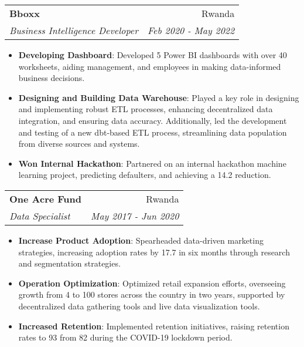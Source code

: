 \documentclass[letterpaper,11pt]{article}
\makeatletter
\newcommand{\resumeItem}[2]{
  \item\small{
    \textbf{#1}{: #2 \vspace{-2pt}}
  }
}
\newcommand{\resumeSubheading}[4]{
  \vspace{-1pt}\item
    \begin{tabular*}{0.97\textwidth}[t]{l@{\extracolsep{\fill}}r}
      \textbf{#1} & #2 \\
      \textit{\small#3} & \textit{\small #4} \\
    \end{tabular*}\vspace{-5pt}
}
\newcommand{\resumeItemListStart}{\begin{itemize}}
\newcommand{\resumeItemListEnd}{\end{itemize}\vspace{-5pt}}
\makeatother
\begin{document}

    \resumeSubheading
      {Bboxx}{Rwanda}
      {Business Intelligence Developer}{Feb 2020 - May 2022}
      \resumeItemListStart
        \resumeItem{Developing Dashboard}
          {Developed 5 Power BI dashboards with over 40 worksheets, aiding management, and employees in making data-informed business decisions.}
        \resumeItem{Designing and Building Data Warehouse}
          {Played a key role in designing and implementing robust ETL processes, enhancing decentralized data integration, and ensuring data accuracy. Additionally, led the development and testing of a new dbt-based ETL process, streamlining data population from diverse sources and systems.}
        \resumeItem{Won Internal Hackathon}
          {Partnered on an internal hackathon machine learning project, predicting defaulters, and achieving a 14.2 reduction.}
      \resumeItemListEnd

    \resumeSubheading
      {One Acre Fund}{Rwanda}
      {Data Specialist}{May 2017 - Jun 2020}
      \resumeItemListStart
        \resumeItem{Increase Product Adoption}
          {Spearheaded data-driven marketing strategies, increasing adoption rates by 17.7 in six months through research and segmentation strategies.}
        \resumeItem{Operation Optimization}
          {Optimized retail expansion efforts, overseeing growth from 4 to 100 stores across the country in two years, supported by decentralized data gathering tools and live data visualization tools.}
      \resumeItem{Increased Retention}
          {Implemented retention initiatives, raising retention rates to 93 from 82 during the COVID-19 lockdown period.}
      \resumeItemListEnd
\end{document}
